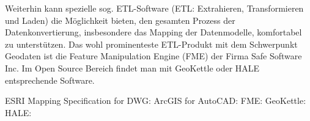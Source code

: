 Weiterhin kann spezielle sog. ETL-Software (ETL: Extrahieren, Transformieren und Laden) die Möglichkeit bieten, den gesamten Prozess der Datenkonvertierung, insbesondere das Mapping der Datenmodelle,  komfortabel zu unterstützen. Das wohl prominenteste ETL-Produkt  mit dem Schwerpunkt Geodaten ist die Feature Manipulation Engine (FME) der Firma Safe Software Inc. Im Open Source Bereich findet man mit GeoKettle oder HALE entsprechende Software.

\begin{flushleft}
	ESRI Mapping Specification for DWG: 
	ArcGIS for AutoCAD: 
	FME: 
	GeoKettle: 
	HALE: 
\end{flushleft}

